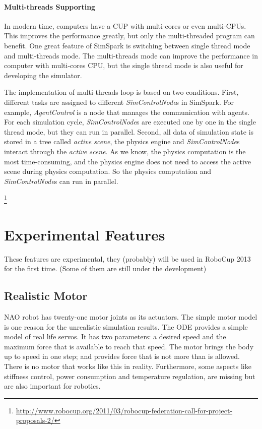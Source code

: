 \documentclass{llncs}
\begin{document}
\paragraph{Multi-threads Supporting}
In modern time, computers have a CUP with multi-cores or even multi-CPUs.
This improves the performance greatly, but only the multi-threaded program can benefit.
One great feature of SimSpark is switching between single thread mode and multi-threads
mode. The multi-threads mode can improve the performance in computer with multi-cores CPU, but the single thread mode is also useful for developing the simulator. 

The implementation of multi-threads loop is based on two conditions.
First, different tasks are assigned to different \textit{SimControlNode}s in SimSpark.
For example, \textit{AgentControl} is a node that manages the communication with agents.
For each simulation cycle, \textit{SimControlNode}s are executed one by one in the single thread mode, but they can run in parallel.
Second, all data of simulation state is stored in a tree called \textit{active scene},
the physics engine and \textit{SimControlNode}s interact through the \textit{active scene}.
As we know, the physics computation is the most time-consuming, and the physics engine does not need to access the active scene during physics computation.
So the physics computation and \textit{SimControlNode}s can run in parallel.

\footnote{\url{http://www.robocup.org/2011/03/robocup-federation-call-for-project-proposals-2/}}



\section{Experimental Features}
These features are experimental, they (probably) will be used in RoboCup 2013 for the first time. (Some of them are still under the development)

\subsection{Realistic Motor}
NAO robot has twenty-one motor joints as its actuators.
The simple motor model is one reason for the unrealistic simulation results.
The ODE provides a simple model of real life servos.
It has two parameters: a desired speed and the maximum force that is available to reach that speed. The motor brings the body up to speed in one step; and provides force that is not more than is allowed.
There is no motor that works like this in reality.
Furthermore, some aspects like stiffness control, power consumption and temperature regulation, are missing but are also important for robotics.
\end{document}
